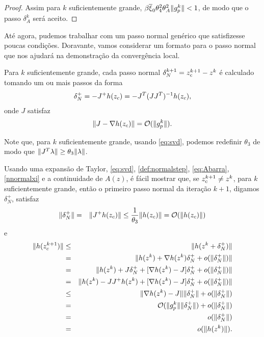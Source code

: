 \begin{proof}
Assim para $k$ suficientemente grande, $\beta\overline{\xi}_0 \theta_4^2
\theta_A^2\Vert g_p^{k}\Vert < 1$, de modo que o passo $\delta_A^k$ será aceito.
\end{proof}

Até agora, pudemos trabalhar com um passo normal genérico que satisfizesse
poucas condições. Doravante, vamos considerar um formato para o passo normal que
nos ajudará na demonstração da convergência local.

\begin{hypoenv}
Para $k$ suficientemente grande, cada passo normal $\delta_N^{k+1} =
z_c^{k+1}-z^k$ é calculado tomando um ou mais passos da forma
\begin{eqnarray}
 \delta_N^+ = -J^+h(z_c) = -J^T(JJ^T)^{-1}h(z_c),\visiblelbl{def:normalstep}
\end{eqnarray}
onde $J$ satisfaz
\begin{eqnarray}
 \norma{J - \nabla h(z_c)} = \bigo(\norma{\gpk{k}}). \visiblelbl{eq:Abarra}
\end{eqnarray}
\end{hypoenv}
Note que, para $k$ suficientemente grande, usando \eqref{eq:svd}, podemos
redefinir $\theta_3$ de modo que 
$\Vert J^T\lambda\Vert \geq \theta_3\Vert \lambda\Vert$.

Usando uma expansão de Taylor, \eqref{eq:svd}, \eqref{def:normalstep}, \eqref{eq:Abarra},
\eqref{nnormalxi} e a 
continuidade de $A(z)$, é fácil mostrar que, se $z_c^{k+1} \neq z^k$, para $k$
suficientemente grande, então o primeiro passo 
normal da iteração $k+1$, digamos $\delta_N^+$, satisfaz
\begin{eqnarray}
 \Vert \delta_N^+\Vert & = & \Vert J^+ h(z_c)\Vert \leq
  \frac{1}{\theta_3}\Vert h(z_c)\Vert = \mathcal{O}(\Vert h(z_c)\Vert)
\end{eqnarray}
e
\begin{eqnarray}
 \norma{h(\zc{k+1})} & \leq & \norma{h(z^k + \delta_N^+)} \nonumber \\
& = & \norma{h(z^k) + \nabla h(z^k)\delta_N^+ + o(\norma{\delta_N^+})} \nonumber \\
& = & \norma{h(z^k) + J\delta_N^+ + [\nabla h(z^k)-J]\delta_N^+ + 
o(\norma{\delta_N^+})} \nonumber \\
& = &  \norma{ h(z^k) - JJ^+h(z^k) + [ \nabla h(z^k) - J] \delta_N^+ + o(\norma{\delta_N^+})} \nonumber \\
& \leq & \norma{\nabla h(z^k) - J}\norma{\delta_N^+} + o(\norma{\delta_N^+}) \nonumber \\
& = & \bigo (\norma{\gpk{k}}\norma{\delta_N^+}) + o(\norma{\delta_N^+}) \nonumber \\
& = & o(\norma{\delta_N^+}) \nonumber \\
& = & o(\norma{h(z^k)}). \visiblelbl{eq:hzckp}
\end{eqnarray}

